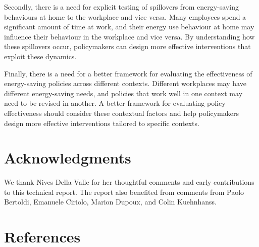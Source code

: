 \documentclass[
  12pt,
  captions=heading]{scrreport}
\begin{document}
Secondly, there is a need for explicit testing of spillovers from
energy-saving behaviours at home to the workplace and vice versa. Many
employees spend a significant amount of time at work, and their energy
use behaviour at home may influence their behaviour in the workplace and
vice versa. By understanding how these spillovers occur, policymakers
can design more effective interventions that exploit these dynamics.

Finally, there is a need for a better framework for evaluating the
effectiveness of energy-saving policies across different contexts.
Different workplaces may have different energy-saving needs, and
policies that work well in one context may need to be revised in
another. A better framework for evaluating policy effectiveness should
consider these contextual factors and help policymakers design more
effective interventions tailored to specific contexts.

\hypertarget{acknowledgments}{%
\chapter{Acknowledgments}\label{acknowledgments}}

We thank Nives Della Valle for her thoughtful comments and early
contributions to this technical report. The report also benefited from
comments from Paolo Bertoldi, Emanuele Ciriolo, Marion Dupoux, and Colin
Kuehnhanss.

\hypertarget{references}{%
\chapter*{References}\label{references}}
\end{document}
